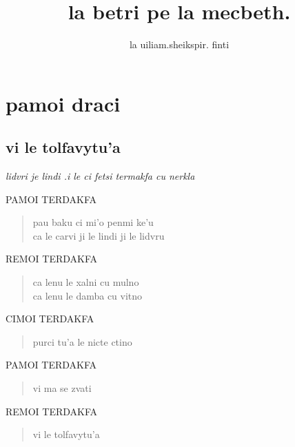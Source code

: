 \documentclass{book}
\title{la betri pe la mecbeth.}
\author{la uiliam.sheikspir. finti}
\begin{document}
\maketitle


\newcommand{\act}[1]{\part{#1}}
\newcommand{\scene}[1]{\chapter{#1}}

\newcommand{\stagedir}[1]{\textit{#1}}
\newcommand{\exeunt}{\stagedir{Exeunt.}}

\newcommand{\speak}[2]{
	\begin{center}
	\MakeUppercase{#1}
	\end{center}

	\begin{quote}#2\end{quote}
}


\act{pamoi draci}

\scene{vi le tolfavytu'a}

\stagedir{lidvri je lindi .i le ci fetsi termakfa cu nerkla}

\speak{pamoi terdakfa}{
	pau baku ci mi'o penmi ke'u\\
	ca le carvi ji le lindi ji le lidvru}

\speak{remoi terdakfa}{
	ca lenu le xalni cu mulno\\
	ca lenu le damba cu vitno}

\speak{cimoi terdakfa}{
	purci tu'a le nicte ctino}

\speak{pamoi terdakfa}{
	vi ma se zvati}

\speak{remoi terdakfa}{
	vi le tolfavytu'a}
\end{document}
